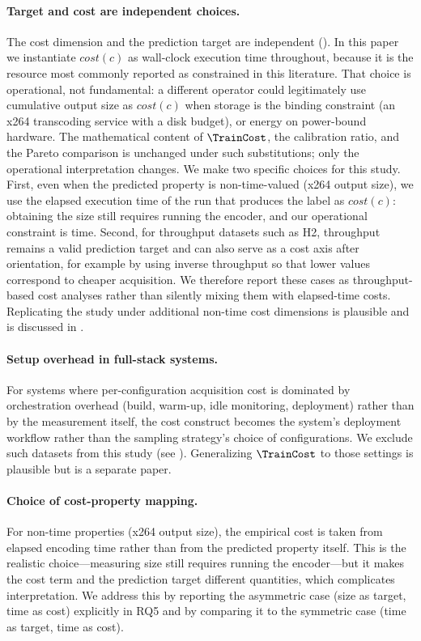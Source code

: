 \paragraph*{Target and cost are independent choices.}
The cost dimension and the prediction target are independent
(). In this paper we instantiate
$\mathit{cost}(c)$ as wall-clock execution time throughout, because it is
the resource most commonly reported as constrained in this literature.
That choice is operational, not fundamental: a different operator could
legitimately use cumulative output size as $\mathit{cost}(c)$ when storage
is the binding constraint (\eg an x264 transcoding service with a disk
budget), or energy on power-bound hardware. The mathematical content of
$\TrainCost$, the calibration ratio, and the Pareto comparison is
unchanged under such substitutions; only the operational interpretation
changes. We make two specific choices for this study. First, even when
the predicted property is non-time-valued (\eg x264 output size), we use
the elapsed execution time of the run that produces the label as
$\mathit{cost}(c)$: obtaining the size still requires running the
encoder, and our operational constraint is time. Second, for throughput
datasets such as H2, throughput remains a valid prediction target and can
also serve as a cost axis after orientation, for example by using inverse
throughput so that lower values correspond to cheaper acquisition. We
therefore report these cases as throughput-based cost analyses rather than
silently mixing them with elapsed-time costs. Replicating the study under
additional non-time cost dimensions is plausible and is discussed in
.

\paragraph*{Setup overhead in full-stack systems.}
For systems where per-configuration acquisition cost is dominated by
orchestration overhead (build, warm-up, idle monitoring, deployment) rather
than by the measurement itself, the cost construct becomes the system's
deployment workflow rather than the sampling strategy's choice of
configurations. We exclude such datasets from this study (see
). Generalizing $\TrainCost$ to those settings is
plausible but is a separate paper.

\paragraph*{Choice of cost-property mapping.}
For non-time properties (\eg x264 output size), the empirical cost is taken
from elapsed encoding time rather than from the predicted property
itself. This is the realistic choice---measuring size still requires running
the encoder---but it makes the cost term and the prediction target different
quantities, which complicates interpretation. We address this by reporting
the asymmetric case (size as target, time as cost) explicitly in RQ5 and by
comparing it to the symmetric case (time as target, time as cost).

